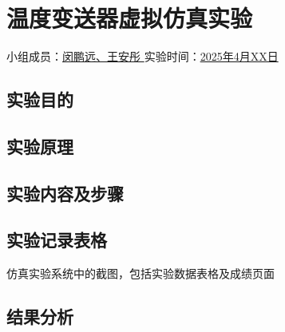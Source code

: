 \section{温度变送器虚拟仿真实验}

\begin{center}
    {
        小组成员：\underline{\quad 闵鹏远、王安彤 \quad} \quad
        实验时间：\underline{\quad 2025年4月XX日 \quad}
    }
\end{center}

\subsection{实验目的}

\subsection{实验原理}

\subsection{实验内容及步骤}

\subsection{实验记录表格}
仿真实验系统中的截图，包括实验数据表格及成绩页面

\subsection{结果分析}

\newpage